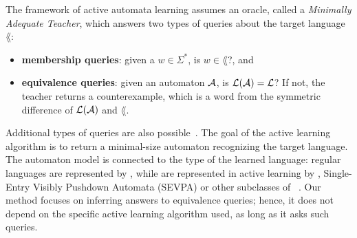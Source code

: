 The framework of active automata learning assumes an oracle, called a \emph{Minimally Adequate Teacher}, which answers two types of queries about the target language $\lang$: 
\begin{itemize}
\item \textbf{membership queries}: given a $w \in \Sigma^*$, is $w \in \lang$?, and
\item \textbf{equivalence queries}: given an automaton $\mathcal{A}$, is $\mathcal{L}(\mathcal{A}) = \mathcal{L}$? 
If not, the teacher returns a counterexample, which is a word from the symmetric difference of $\mathcal{L}(\mathcal{A})$ and $\lang$.
\end{itemize}
Additional types of queries are also possible~\cite{mfcs22}.
The goal of the active learning algorithm is to return a minimal-size automaton recognizing the target language. 
The automaton model is connected to the type of the learned language: 
regular languages are represented by \DFA, while \VPLs are represented in active learning by \DVPA, Single-Entry Visibly Pushdown Automata (SEVPA) or 
other subclasses of \DVPA~\cite{alur2005congruences,DBLP:conf/mfcs/ChervetW07}.
Our method focuses on inferring answers to equivalence queries; hence, it does not depend on the specific active learning algorithm used, as long as it asks such queries.

